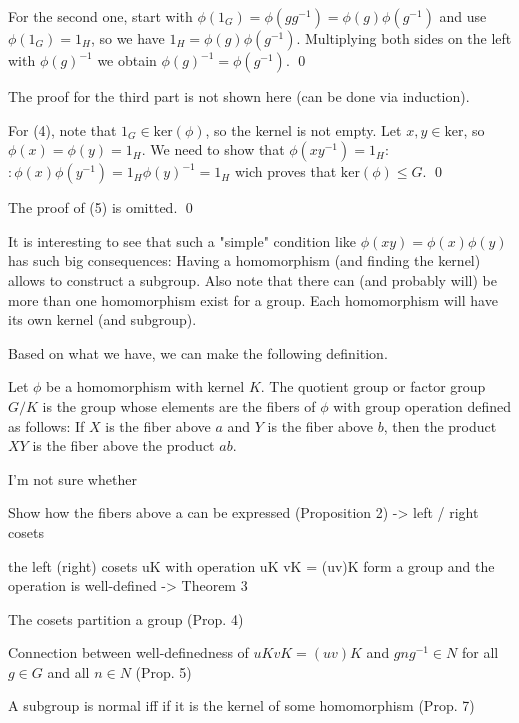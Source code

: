 For the second one, start with $\phi(1_G) = \phi(gg^{-1}) = \phi(g) \phi(g^{-1})$ and use $\phi(1_G) = 1_H$, so we have $1_H = \phi(g) \phi(g^{-1})$. Multiplying both sides on the left with $\phi(g)^{-1}$ we obtain $\phi(g)^{-1} = \phi(g^{-1})$. \qed

The proof for the third part is not shown here (can be done via induction).

For (4), note that $1_G \in \text{ker}(\phi)$, so the kernel is not empty. Let $x,y \in \text{ker}$, so $\phi(x) = \phi(y) = 1_H$. We need to show that $\phi(xy^{-1}) = 1_H$: $:\phi(x)\phi(y^{-1}) = 1_H \phi(y)^{-1} = 1_H$ wich proves that $\text{ker}(\phi) \leq G$. \qed

The proof of (5) is omitted. \qed

It is interesting to see that such a "simple" condition like $\phi(x y) = \phi(x) \phi(y)$ has such big consequences: Having a homomorphism (and finding the kernel) allows to construct a subgroup. Also note that there can (and probably will) be more than one homomorphism exist for a group. Each homomorphism will have its own kernel (and subgroup).

Based on what we have, we can make the following definition. 

\begin{definition}
Let $\phi$ be a homomorphism with kernel $K$. The quotient group or factor group $G/K$ is the group whose elements are the fibers of $\phi$ with group operation defined as follows: If $X$ is the fiber above $a$ and $Y$ is the fiber above $b$, then the product $XY$ is the fiber above the product $ab$.
\end{definition}

I'm not sure whether 


Show how the fibers above a can be expressed (Proposition 2) -> left / right cosets

the left (right) cosets uK with operation uK vK = (uv)K form a group and the operation is well-defined -> Theorem 3

The cosets partition a group (Prop. 4)

Connection between well-definedness of $uK vK = (uv)K$ and $gng^{-1} \in N$ for all $g \in G$ and all $n \in N$ (Prop. 5)

A subgroup is normal iff if it is the kernel of some homomorphism (Prop. 7)

